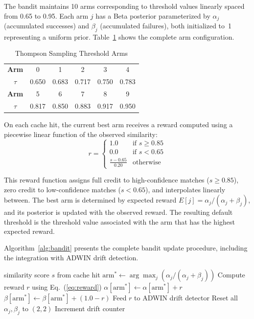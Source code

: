 \documentclass[conference]{IEEEtran}
\begin{document}
The bandit maintains 10 arms corresponding to threshold values linearly spaced from 0.65 to 0.95. Each arm $j$ has a Beta posterior parameterized by $\alpha_j$ (accumulated successes) and $\beta_j$ (accumulated failures), both initialized to~1 representing a uniform prior. Table~\ref{tab:arms} shows the complete arm configuration.

\begin{table}[t]
\centering
\caption{Thompson Sampling Threshold Arms}
\label{tab:arms}
\begin{tabular}{cccccc}
\toprule
\textbf{Arm} & 0 & 1 & 2 & 3 & 4 \\
\textbf{$\tau$} & 0.650 & 0.683 & 0.717 & 0.750 & 0.783 \\
\midrule
\textbf{Arm} & 5 & 6 & 7 & 8 & 9 \\
\textbf{$\tau$} & 0.817 & 0.850 & 0.883 & 0.917 & 0.950 \\
\bottomrule
\end{tabular}
\end{table}

On each cache hit, the current best arm receives a reward computed using a piecewise linear function of the observed similarity:
\begin{equation}
r = \begin{cases}
1.0 & \text{if } s \geq 0.85 \\
0.0 & \text{if } s < 0.65 \\
\frac{s - 0.65}{0.20} & \text{otherwise}
\end{cases}
\label{eq:reward}
\end{equation}

This reward function assigns full credit to high-confidence matches ($s \geq 0.85$), zero credit to low-confidence matches ($s < 0.65$), and interpolates linearly between. The best arm is determined by expected reward $E[j] = \alpha_j / (\alpha_j + \beta_j)$, and its posterior is updated with the observed reward. The resulting default threshold is the threshold value associated with the arm that has the highest expected reward.

Algorithm~\ref{alg:bandit} presents the complete bandit update procedure, including the integration with ADWIN drift detection.

\begin{algorithm}[t]
\caption{Thompson Sampling Update}
\label{alg:bandit}
\begin{algorithmic}[1]
\REQUIRE similarity score $s$ from cache hit
\STATE $\text{arm}^* \leftarrow \arg\max_j \left(\alpha_j / (\alpha_j + \beta_j)\right)$
\STATE Compute reward $r$ using Eq.~(\ref{eq:reward})
\STATE $\alpha[\text{arm}^*] \leftarrow \alpha[\text{arm}^*] + r$
\STATE $\beta[\text{arm}^*] \leftarrow \beta[\text{arm}^*] + (1.0 - r)$
\STATE Feed $r$ to ADWIN drift detector
    \STATE Reset all $\alpha_j, \beta_j$ to $(2, 2)$
    \STATE Increment drift counter
\ENDIF
\end{algorithmic}
\end{algorithm}
\end{document}
